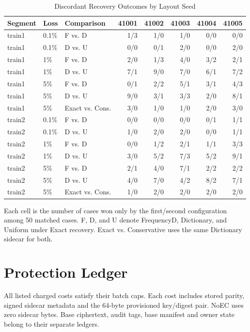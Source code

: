 \documentclass[10pt,journal,onecolumn]{IEEEtran}
\begin{document}
\begin{table}[t]
\centering\small
\caption{Discordant Recovery Outcomes by Layout Seed}
\label{tab:paired-layouts}
\begin{tabular}{@{}lllrrrrr@{}}
\toprule
Segment & Loss & Comparison & 41001 & 41002 & 41003 & 41004 & 41005 \\
\midrule
train1 & 0.1\% & F vs. D & 1/3 & 1/0 & 1/0 & 0/0 & 0/0 \\
train1 & 0.1\% & D vs. U & 0/0 & 0/1 & 2/0 & 0/0 & 2/0 \\
train1 & 1\% & F vs. D & 2/0 & 1/3 & 4/0 & 3/2 & 2/1 \\
train1 & 1\% & D vs. U & 7/1 & 9/0 & 7/0 & 6/1 & 7/2 \\
train1 & 5\% & F vs. D & 0/1 & 2/2 & 5/1 & 3/1 & 4/3 \\
train1 & 5\% & D vs. U & 9/0 & 3/1 & 3/3 & 2/0 & 8/1 \\
train1 & 5\% & Exact vs. Cons. & 3/0 & 1/0 & 1/0 & 2/0 & 3/0 \\
\midrule
train2 & 0.1\% & F vs. D & 0/0 & 0/0 & 0/0 & 0/1 & 1/1 \\
train2 & 0.1\% & D vs. U & 1/0 & 2/0 & 2/0 & 0/0 & 1/1 \\
train2 & 1\% & F vs. D & 0/0 & 1/2 & 2/1 & 1/1 & 3/3 \\
train2 & 1\% & D vs. U & 3/0 & 5/2 & 7/3 & 5/2 & 9/1 \\
train2 & 5\% & F vs. D & 2/1 & 4/0 & 7/1 & 2/2 & 2/2 \\
train2 & 5\% & D vs. U & 4/0 & 7/0 & 4/2 & 8/2 & 7/1 \\
train2 & 5\% & Exact vs. Cons. & 1/0 & 2/0 & 2/0 & 2/0 & 2/0 \\
\bottomrule
\end{tabular}

\parbox{0.87\linewidth}{\footnotesize Each cell is the number of cases won
only by the first/second configuration among 50 matched cases. F, D, and U
denote FrequencyD, Dictionary, and Uniform under Exact recovery. Exact vs.
Conservative uses the same Dictionary sidecar for both.}
\end{table}

\section{Protection Ledger}



All listed charged costs satisfy their batch caps. Each cost includes stored parity, signed sidecar metadata and the 64-byte provisioned key/digest pair. NoEC uses zero sidecar bytes. Base ciphertext, audit tags, base manifest and owner state belong to their separate ledgers.
\end{document}
